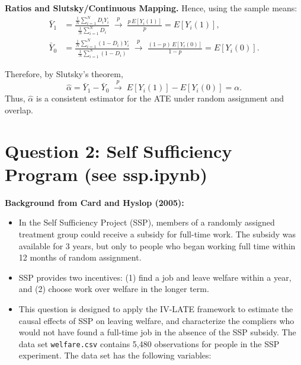 \documentclass[12pt]{article}
\begin{document}
\begin{enumerate}[label=\arabic*.]
    \medskip
    \noindent\textbf{Ratios and Slutsky/Continuous Mapping.}
    Hence, using the sample means:
    \begin{align*}
    \bar Y_1
    &= 
    \frac{\tfrac{1}{N}\sum_{i=1}^N D_i Y_i}{\tfrac{1}{N}\sum_{i=1}^N D_i}
    \;\xrightarrow{p}\;
    \frac{p\,E[Y_i(1)]}{p}
    = E[Y_i(1)], \\[1em]
    \bar Y_0
    &=
    \frac{\tfrac{1}{N}\sum_{i=1}^N (1-D_i) Y_i}{\tfrac{1}{N}\sum_{i=1}^N (1-D_i)}
    \;\xrightarrow{p}\;
    \frac{(1-p)\,E[Y_i(0)]}{1-p}
    = E[Y_i(0)].
    \end{align*}

    \noindent Therefore, by Slutsky's theorem,
    \[
    \hat{\alpha}
    = \bar Y_1 - \bar Y_0
    \;\xrightarrow{p}\;
    E[Y_i(1)] - E[Y_i(0)]
    = \alpha.
    \]
    Thus, $\hat{\alpha}$ is a consistent estimator for the ATE under random assignment and overlap.

\end{enumerate}

\newpage

\section*{Question 2: Self Sufficiency Program (see ssp.ipynb)}

\noindent\textbf{Background from Card and Hyslop (2005):}
\begin{itemize}
    \item In the Self Sufficiency Project (SSP), members of a randomly assigned treatment group could receive a subsidy for full-time work. The subsidy was available for 3 years, but only to people who began working full time within 12 months of random assignment.
    \item SSP provides two incentives: (1) find a job and leave welfare within a year, and (2) choose work over welfare in the longer term.
    \item This question is designed to apply the IV-LATE framework to estimate the causal effects of SSP on leaving welfare, and characterize the compliers who would not have found a full-time job in the absence of the SSP subsidy. The data set \texttt{welfare.csv} contains 5,480 observations for people in the SSP experiment. The data set has the following variables:
\end{itemize}
\end{document}
